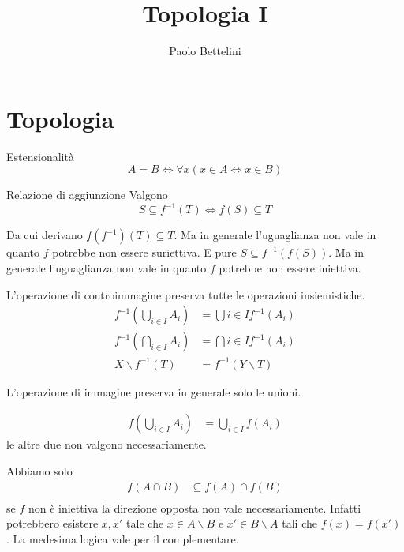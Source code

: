 \documentclass[a4paper]{article}
\title{Topologia I}
\author{Paolo Bettelini}
\date{}
\begin{document}
\maketitle
\tableofcontents

\section{Topologia}

\begin{snippetaxiom}{Estensionalità}
    \[
        A = B \iff \forall x(x\in A \iff x\in B)
    \]
\end{snippetaxiom}



\begin{radioactive}
\begin{snippetproposition}{Relazione di aggiunzione}
    Valgono
    \[
        S \subseteq f^{-1}(T) \iff
        f(S) \subseteq T
    \]
\end{snippetproposition}
\end{radioactive}
Da cui derivano \(f(f^{-1})(T) \subseteq T\).
Ma in generale l'uguaglianza non vale in quanto \(f\) potrebbe non essere suriettiva.
E pure \(S \subseteq f^{-1}(f(S))\).
Ma in generale l'uguaglianza non vale in quanto \(f\) potrebbe non essere iniettiva.

\begin{radioactive}
L'operazione di controimmagine preserva tutte le operazioni insiemistiche.
\begin{align*}
    f^{-1} \left(\bigcup_{i\in I} A_i\right) &= \bigcup{i\in I} f^{-1}(A_i) \\
    f^{-1} \left(\bigcap_{i\in I} A_i\right) &= \bigcap{i\in I} f^{-1}(A_i) \\
    X \backslash f^{-1}(T) &= f^{-1}(Y \backslash T)
\end{align*}

L'operazione di immagine preserva in generale solo le unioni.

\begin{align*}
    f\left(\bigcup_{i\in I} A_i\right) &= \bigcup_{i\in I} f(A_i)
\end{align*}
le altre due non valgono necessariamente.
\end{radioactive}
Abbiamo solo
\begin{align*}
    f(A\cap B) &\subseteq f(A) \cap f(B) \\
\end{align*}
se \(f\) non è iniettiva la direzione opposta non vale necessariamente.
Infatti potrebbero esistere \(x,x'\) tale che \(x \in A \backslash B\)
e \(x' \in B \backslash A\) tali che \(f(x) = f(x')\).
La medesima logica vale per il complementare.
\end{document}
